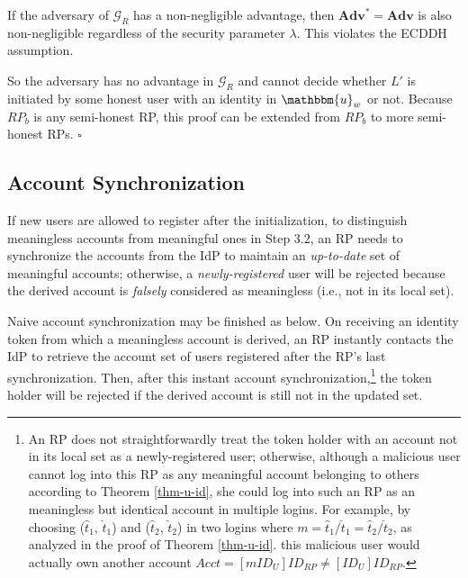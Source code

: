 If the adversary of $\mathcal{G}_R$ has a non-negligible advantage, then $\mathbf{Adv}^*={\mathbf{Adv}}$ is also non-negligible regardless of the security parameter $\lambda$. This violates the ECDDH assumption.

So the adversary has no advantage in $\mathcal{G}_R$ and cannot decide whether $L'$ is initiated by some honest user with an identity in $\mathbbm{u}_w$ or not.
Because $RP_b$ is any semi-honest RP, this proof can be extended from $RP_b$ to more semi-honest RPs.
\hfill $\square$


\subsection{Account Synchronization}
\label{account-syn}
If new users are allowed to register after the initialization,
to distinguish meaningless accounts from meaningful ones in Step 3.2,
 an RP needs to synchronize the accounts from the IdP to maintain an \emph{up-to-date} set of meaningful accounts;
otherwise, 
  a \emph{newly-registered} user will be rejected
    because the derived account is \emph{falsely} considered as meaningless (i.e., not in its local set).

Naive account synchronization may be finished as below.
On receiving an identity token from which a meaningless account is derived,
    an RP instantly contacts the IdP to retrieve the account set of users registered after the RP's last synchronization.
Then, after this instant account synchronization,\footnote{An RP does not straightforwardly treat the token holder with an account not in its local set
 as a newly-registered user;
otherwise,
although a malicious user cannot log into this RP as any meaningful account belonging to others according to Theorem \ref{thm-u-id},
 she could log into such an RP as an meaningless but identical account in multiple logins.
For example,
    by choosing ($\hat{t}_1$, $\check{t}_1$) and ($\hat{t}_2$, $\check{t}_2$) in two logins
     where $m=\hat{t}_1/\check{t}_1 = \hat{t}_2/\check{t}_2$,
    as analyzed in the proof of Theorem \ref{thm-u-id}.
this malicious user would actually own another account $Acct=[mID_U]ID_{RP} \neq [ID_U]ID_{RP}$.} 
    the token holder will be rejected
     if the derived account is still not in the updated set.


